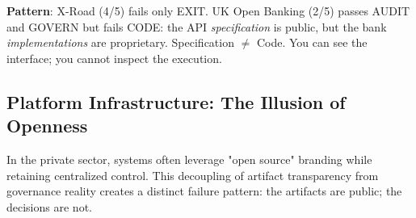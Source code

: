 \textbf{Pattern}: X-Road (4/5) fails only EXIT. UK Open Banking (2/5) passes AUDIT and GOVERN but fails CODE: the API \textit{specification} is public, but the bank \textit{implementations} are proprietary. Specification $\neq$ Code. You can see the interface; you cannot inspect the execution.

\subsection{Platform Infrastructure: The Illusion of Openness}

In the private sector, systems often leverage "open source" branding while retaining centralized control. This decoupling of artifact transparency from governance reality creates a distinct failure pattern: the artifacts are public; the decisions are not.

